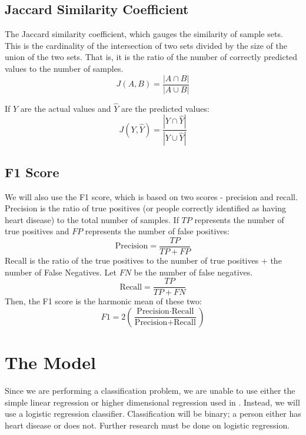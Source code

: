 \documentclass[letter]{article}
\begin{document}
\subsection{Jaccard Similarity Coefficient}
The Jaccard similarity coefficient, which gauges the similarity of sample sets.  This is the cardinality of the intersection of two sets divided by the size of the union of the two sets.  That is, it is the ratio of the number of correctly predicted values to the number of samples.
\begin{equation*}
	J(A,B) = \frac{|A \cap B|}{|A \cup B|}
\end{equation*}

If \(Y\) are the actual values and \(\hat Y\) are the predicted values:
\begin{equation}
	J(Y, \hat Y) = \frac{|Y \cap \hat Y|}{|Y \cup \hat Y|}
\end{equation}

\subsection{F1 Score}
We will also use the F1 score, which is based on two scores - precision and recall.  Precision is the ratio of true positives (or people correctly identified as having heart disease) to the total number of samples.  If \(TP\) represents the number of true positives and \(FP\) represents the number of false positives:
\begin{equation}
	\textrm{Precision} = \frac{TP}{TP + FP}
\end{equation}
Recall is the ratio of the true positives to the number of true positives + the number of False Negatives.  Let \(FN\) be the number of false negatives.
\begin{equation}
	\textrm{Recall} = \frac{TP}{TP+FN}
\end{equation}
Then, the F1 score is the harmonic mean of these two:
\begin{equation}
	F1=2 \left( \frac{\textrm{Precision} \cdot \textrm{Recall}}{\textrm{Precision} + \textrm{Recall}}\right)
\end{equation}

\section{The Model}
Since we are performing a classification problem, we are unable to use either the simple linear regression or higher dimensional regression used in
\cite{yoonsuhmulpred}.  Instead, we will use a logistic regression classifier.  Classification will be binary; a person either has heart disease or does not.  Further research must be done on logistic regression.
\end{document}
